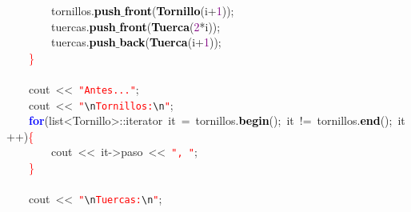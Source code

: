 \mbox{}\ \ \ \ \ \ \ \ tornillos\textcolor{BrickRed}{.}\textbf{\textcolor{Black}{push$\_$front}}\textcolor{BrickRed}{(}\textbf{\textcolor{Black}{Tornillo}}\textcolor{BrickRed}{(}i\textcolor{BrickRed}{+}\textcolor{Purple}{1}\textcolor{BrickRed}{));} \\
\mbox{}\ \ \ \ \ \ \ \ tuercas\textcolor{BrickRed}{.}\textbf{\textcolor{Black}{push$\_$front}}\textcolor{BrickRed}{(}\textbf{\textcolor{Black}{Tuerca}}\textcolor{BrickRed}{(}\textcolor{Purple}{2}\textcolor{BrickRed}{*}i\textcolor{BrickRed}{));} \\
\mbox{}\ \ \ \ \ \ \ \ tuercas\textcolor{BrickRed}{.}\textbf{\textcolor{Black}{push$\_$back}}\textcolor{BrickRed}{(}\textbf{\textcolor{Black}{Tuerca}}\textcolor{BrickRed}{(}i\textcolor{BrickRed}{+}\textcolor{Purple}{1}\textcolor{BrickRed}{));} \\
\mbox{}\ \ \ \ \textcolor{Red}{\}} \\
\mbox{} \\
\mbox{}\ \ \ \ cout\ \textcolor{BrickRed}{\textless{}\textless{}}\ \texttt{\textcolor{Red}{"{}Antes..."{}}}\textcolor{BrickRed}{;} \\
\mbox{}\ \ \ \ cout\ \textcolor{BrickRed}{\textless{}\textless{}}\ \texttt{\textcolor{Red}{"{}}}\texttt{\textcolor{CarnationPink}{\textbackslash{}n}}\texttt{\textcolor{Red}{Tornillos:}}\texttt{\textcolor{CarnationPink}{\textbackslash{}n}}\texttt{\textcolor{Red}{"{}}}\textcolor{BrickRed}{;} \\
\mbox{}\ \ \ \ \textbf{\textcolor{Blue}{for}}\textcolor{BrickRed}{(}list\textcolor{BrickRed}{\textless{}}Tornillo\textcolor{BrickRed}{\textgreater{}::}\textcolor{TealBlue}{iterator}\ it\ \textcolor{BrickRed}{=}\ tornillos\textcolor{BrickRed}{.}\textbf{\textcolor{Black}{begin}}\textcolor{BrickRed}{();}\ it\ \textcolor{BrickRed}{!=}\ tornillos\textcolor{BrickRed}{.}\textbf{\textcolor{Black}{end}}\textcolor{BrickRed}{();}\ it\textcolor{BrickRed}{++)}\textcolor{Red}{\{} \\
\mbox{}\ \ \ \ \ \ \ \ cout\ \textcolor{BrickRed}{\textless{}\textless{}}\ it\textcolor{BrickRed}{-\textgreater{}}paso\ \textcolor{BrickRed}{\textless{}\textless{}}\ \texttt{\textcolor{Red}{"{},\ "{}}}\textcolor{BrickRed}{;} \\
\mbox{}\ \ \ \ \textcolor{Red}{\}} \\
\mbox{} \\
\mbox{}\ \ \ \ cout\ \textcolor{BrickRed}{\textless{}\textless{}}\ \texttt{\textcolor{Red}{"{}}}\texttt{\textcolor{CarnationPink}{\textbackslash{}n}}\texttt{\textcolor{Red}{Tuercas:}}\texttt{\textcolor{CarnationPink}{\textbackslash{}n}}\texttt{\textcolor{Red}{"{}}}\textcolor{BrickRed}{;} \\
